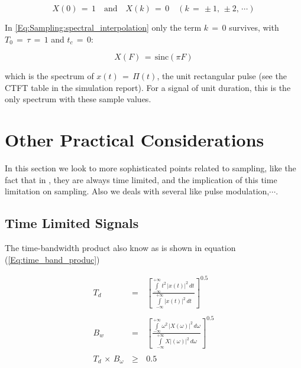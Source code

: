 \begin{equation}
X(0) \, = \, 1 \quad \text{and} \quad X(k) \, = \, 0 \quad (k \, = \, \pm 1, \, \pm 2, \, \cdots)
\end{equation}

In \autoref{Eq:Sampling:spectral_interpolation} only the term $k \, = \, 0$ survives, with $T_0 \, = \, \tau \, = \, 1$ and $t_c \, = \, 0$:

\begin{equation}
X(F) \, = \, \text{sinc}(\pi F)
\end{equation}

which is the spectrum of $x(t) \, = \, \Pi(t)$, the unit rectangular pulse (see the CTFT table in the simulation report). For a signal of unit duration, this is the only spectrum with these sample values.


\newpage
\section{Other Practical Considerations}

In this section we look to more sophisticated points related to sampling, like the fact that in , they are always time limited, and the implication of this time limitation on sampling. Also we deals with several  like pulse modulation,$\cdots$.

\subsection{Time Limited Signals}

The time-bandwidth product also know as  is shown in equation (\ref{Eq:time_band_produc}) 

\begin{equation}
\begin{array}{rcl}
T_d \, &=& \, \left[ \displaystyle\frac{\int\limits_{-\infty}^{+\infty}  t^2 \, |x(t)|^2 \, dt}{\int\limits_{-\infty}^{+\infty} |x(t)|^2 \, dt} \right]^{0.5} \\ \\
B_w \, &=& \, \left[ \displaystyle\frac{\int\limits_{-\infty}^{+\infty}  \omega^2 \, |X(\omega)|^2 \, d\omega}{\int\limits_{-\infty}^{+\infty} X|(\omega)|^2  \, d\omega} \right]^{0.5} \\ \\
T_d \, \times \, B_{\omega} \, &\geq& \, 0.5
\end{array}
\label{Eq:time_band_produc}
\end{equation}

